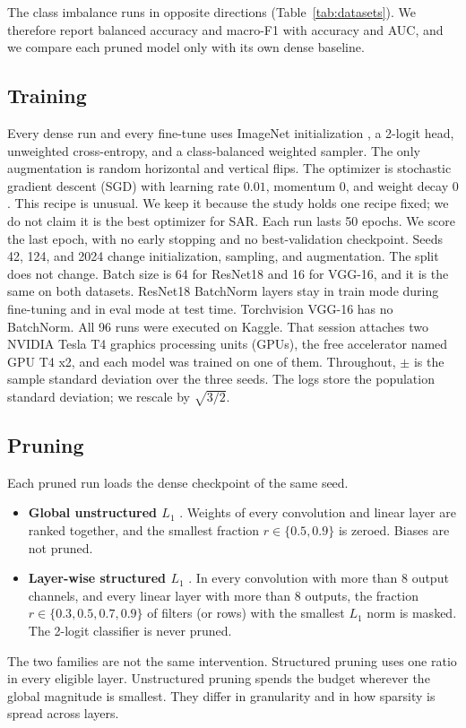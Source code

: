 \documentclass[conference]{IEEEtran}
\begin{document}
The class imbalance runs in opposite directions
(Table~\ref{tab:datasets}). We therefore report balanced accuracy and
macro-F1 with accuracy and AUC, and we compare each pruned model only
with its own dense baseline.

\subsection{Training}
Every dense run and every fine-tune uses ImageNet initialization
\cite{deng2009imagenet}, a 2-logit head, unweighted cross-entropy, and
a class-balanced weighted sampler. The only augmentation is random
horizontal and vertical flips. The optimizer is stochastic gradient descent (SGD) with learning rate
$0.01$, momentum $0$, and weight decay $0$. This recipe is unusual. We
keep it because the study holds one recipe fixed; we do not claim it is
the best optimizer for SAR. Each run lasts 50 epochs. We score the last
epoch, with no early stopping and no best-validation checkpoint.
Seeds 42, 124, and 2024 change initialization, sampling, and
augmentation. The split does not change. Batch size is 64 for ResNet18
and 16 for VGG-16, and it is the same on both datasets.
ResNet18 BatchNorm layers stay in train mode during fine-tuning and in
eval mode at test time. Torchvision VGG-16 has no BatchNorm.
All 96 runs were executed on Kaggle. That session attaches two NVIDIA
Tesla T4 graphics processing units (GPUs), the free accelerator named
GPU T4 x2, and each model was trained on one of them.
Throughout, $\pm$ is the sample standard deviation over the three seeds.
The logs store the population standard deviation; we rescale by
$\sqrt{3/2}$.

\subsection{Pruning}
Each pruned run loads the dense checkpoint of the same seed.
\begin{itemize}
\item \textbf{Global unstructured $L_1$} \cite{han2015learning}.
Weights of every convolution and linear layer are ranked together, and
the smallest fraction $r\in\{0.5,0.9\}$ is zeroed. Biases are not
pruned.
\item \textbf{Layer-wise structured $L_1$} \cite{li2017pruning}.
In every convolution with more than 8 output channels, and every linear
layer with more than 8 outputs, the fraction
$r\in\{0.3,0.5,0.7,0.9\}$ of filters (or rows) with the smallest $L_1$
norm is masked. The 2-logit classifier is never pruned.
\end{itemize}
The two families are not the same intervention. Structured pruning uses
one ratio in every eligible layer. Unstructured pruning spends the
budget wherever the global magnitude is smallest. They differ in
granularity and in how sparsity is spread across layers.
\end{document}
